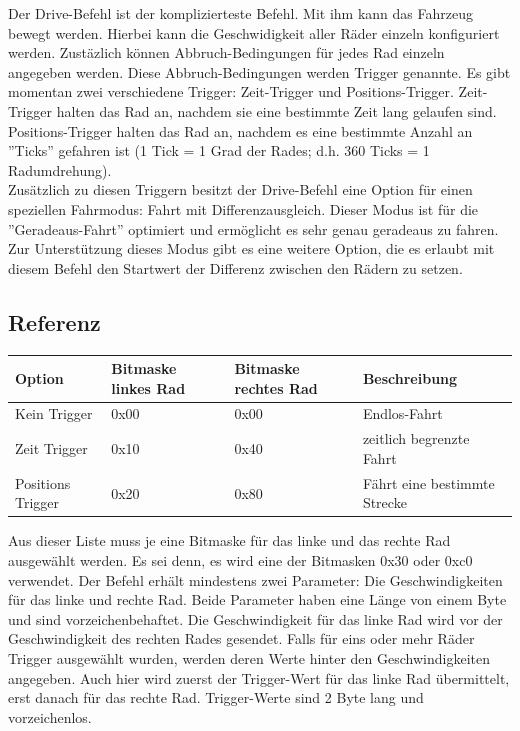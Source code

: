 \documentclass[a4paper]{article}
\begin{document}
	Der Drive-Befehl ist der komplizierteste Befehl. Mit ihm kann das
	Fahrzeug bewegt werden. Hierbei kann die Geschwidigkeit aller Räder
	einzeln konfiguriert werden. Zustäzlich können Abbruch-Bedingungen
	für jedes Rad einzeln angegeben werden. Diese Abbruch-Bedingungen
	werden Trigger genannte. Es gibt momentan zwei verschiedene Trigger:
	Zeit-Trigger und Positions-Trigger. Zeit-Trigger halten das Rad an,
	nachdem sie eine bestimmte Zeit lang gelaufen sind. Positions-Trigger
	halten das Rad an, nachdem es eine bestimmte Anzahl an ''Ticks''
	gefahren ist (1 Tick = 1 Grad der Rades; d.h. 360 Ticks = 1
	Radumdrehung).
	\\
	Zusätzlich zu diesen Triggern besitzt der Drive-Befehl eine Option
	für einen speziellen Fahrmodus: Fahrt mit Differenzausgleich. Dieser
	Modus ist für die ''Geradeaus-Fahrt'' optimiert und ermöglicht es
	sehr genau geradeaus zu fahren. Zur Unterstützung dieses Modus
	gibt es eine weitere Option, die es erlaubt mit diesem Befehl den
	Startwert der Differenz zwischen den Rädern zu setzen.

	\subsection{Referenz}

	\begin{tabularx}{\linewidth}{|l|l|l|X|}
		\hline
		\textbf{Option} & \textbf{Bitmaske linkes Rad} & \textbf{Bitmaske rechtes Rad} & \textbf{Beschreibung} \\
		\hline
		\hline
		Kein Trigger	& 0x00						   & 0x00						   & Endlos-Fahrt \\
		\hline
		Zeit Trigger	& 0x10						   & 0x40						   & zeitlich begrenzte Fahrt\\
		\hline
		Positions Trigger & 0x20					   & 0x80						   & Fährt eine bestimmte Strecke \\
		\hline
	\end{tabularx}

	Aus dieser Liste muss je eine Bitmaske für das linke und das rechte
	Rad ausgewählt werden. Es sei denn, es wird eine der Bitmasken 0x30
	oder 0xc0 verwendet. Der Befehl erhält mindestens zwei Parameter:
	Die Geschwindigkeiten für das linke und rechte Rad. Beide
	Parameter haben eine Länge von einem Byte und sind vorzeichenbehaftet.
	Die Geschwindigkeit für das linke Rad wird vor der Geschwindigkeit
	des rechten Rades gesendet. Falls für eins oder mehr Räder Trigger
	ausgewählt wurden, werden deren Werte hinter den Geschwindigkeiten
	angegeben. Auch hier wird zuerst der Trigger-Wert für das linke Rad
	übermittelt, erst danach für das rechte Rad. Trigger-Werte sind
	2 Byte lang und vorzeichenlos.
	
\end{document}
